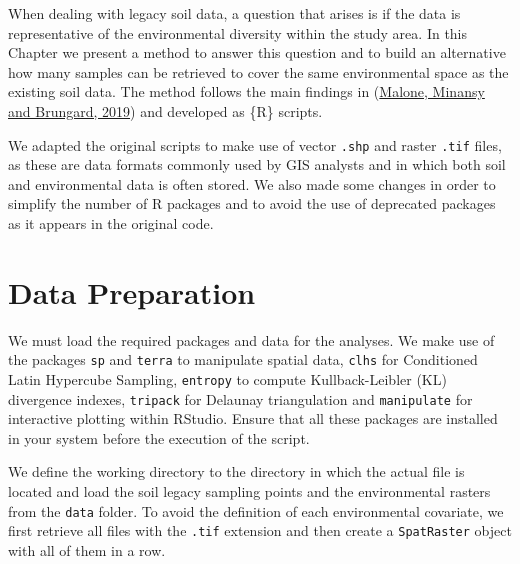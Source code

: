 \documentclass[
]{book}
\newenvironment{Shaded}{\begin{snugshade}}{\end{snugshade}}
\newcommand{\CommentTok}[1]{\textcolor[rgb]{0.56,0.35,0.01}{\textit{#1}}}
\begin{document}
When dealing with legacy soil data, a question that arises is if the data is representative of the environmental diversity within the study area. In this Chapter we present a method to answer this question and to build an alternative how many samples can be retrieved to cover the same environmental space as the existing soil data. The method follows the main findings in (\protect\hyperlink{ref-Malone}{Malone, Minansy and Brungard, 2019}) and developed as \{R\} scripts.

We adapted the original scripts to make use of vector \texttt{\textquotesingle{}.shp\textquotesingle{}} and raster \texttt{\textquotesingle{}.tif\textquotesingle{}} files, as these are data formats commonly used by GIS analysts and in which both soil and environmental data is often stored. We also made some changes in order to simplify the number of R packages and to avoid the use of deprecated packages as it appears in the original code.

\hypertarget{data-preparation}{%
\section{Data Preparation}\label{data-preparation}}

We must load the required packages and data for the analyses. We make use of the packages \texttt{sp} and \texttt{terra} to manipulate spatial data, \texttt{clhs} for Conditioned Latin Hypercube Sampling, \texttt{entropy} to compute Kullback-Leibler (KL) divergence indexes, \texttt{tripack} for Delaunay triangulation and \texttt{manipulate} for interactive plotting within RStudio. Ensure that all these packages are installed in your system before the execution of the script.

We define the working directory to the directory in which the actual file is located and load the soil legacy sampling points and the environmental rasters from the \texttt{data} folder. To avoid the definition of each environmental covariate, we first retrieve all files with the \texttt{.tif} extension and then create a \texttt{SpatRaster} object with all of them in a row.

\begin{Shaded}
\end{Shaded}
\end{document}
